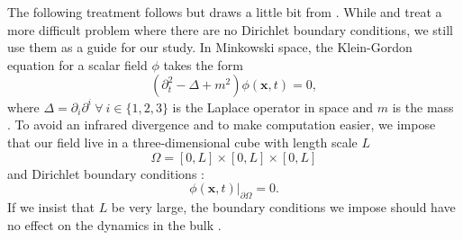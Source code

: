 \documentclass[]{article}
\newcommand{\eval}{\biggr\rvert} %
\newcommand{\myvec}[1]{\mathbf{#1}} %
\newcommand{\vx}{\myvec{x}}
\begin{document}
The following treatment follows \cite{Kempf} but draws a little bit
from \cite{MukhanovWinitzki}. While \cite{Kempf} and
\cite{MukhanovWinitzki} treat a more difficult problem where there are
no Dirichlet boundary conditions, we still use them as a guide for our
study. In Minkowski space, the Klein-Gordon equation for a scalar
field $\phi$ takes the form
\begin{equation}
  \label{eq:Minkowski:KG}
  \left(\partial_t^2 - \Delta + m^2\right)\phi(\vx,t) = 0,
\end{equation}
where $\Delta=\partial_i\partial^i\ \forall\ i\in\{1,2,3\}$ is the
Laplace operator in space and $m$ is the mass
\cite{Kempf,MukhanovWinitzki}. To avoid an infrared divergence and to
make computation easier, we impose that our field live in a
three-dimensional cube with length scale $L$
\begin{equation}
  \label{eq:Minkowski:domain}
  \Omega = \left[0,L\right]\times\left[0,L\right]\times\left[0,L\right]
\end{equation}
and Dirichlet boundary conditions \cite{Kempf}:
\begin{equation}
  \label{eq:Dirichlet:Boundary}
  \phi(\vx,t)\eval_{\partial\Omega} = 0.
\end{equation}
If we insist that $L$ be very large, the boundary conditions we impose
should have no effect on the dynamics in the bulk \cite{Kempf,MukhanovWinitzki}.





\end{document}
